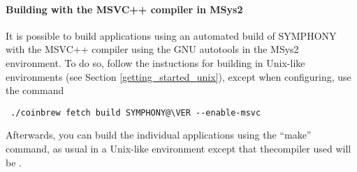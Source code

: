 \paragraph{Building with the MSVC++ compiler in MSys2}

It is possible to build applications using an automated build of SYMPHONY
with the MSVC++ compiler  using the GNU autotools in the MSys2
environment. To do so, follow the instuctions for building in Unix-like
environments (see Section \ref{getting_started_unix}), except when
configuring, use the command

{\color{brown}
\begin{verbatim}
 ./coinbrew fetch build SYMPHONY@\VER --enable-msvc
\end{verbatim}}

Afterwards, you can build the individual applications using the ``make''
command, as usual in a Unix-like environment except that thecompiler used will
be .
